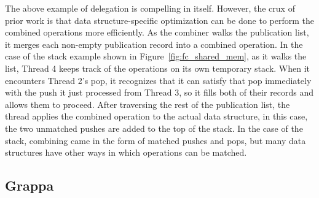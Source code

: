 The above example of delegation is compelling in itself. However, the crux of prior work is that data structure-specific optimization can be done to perform the combined operations more efficiently.
As the combiner walks the publication list, it merges each non-empty publication record into a combined operation. In the case of the stack example shown in Figure~\ref{fig:fc_shared_mem}, as it walks the list, Thread 4 keeps track of the operations on its own temporary stack. When it encounters Thread 2's pop, it recognizes that it can satisfy that pop immediately with the push it just processed from Thread 3, so it fills both of their records and allows them to proceed. After traversing the rest of the publication list, the thread applies the combined operation to the actual data structure, in this case, the two unmatched pushes are added to the top of the stack.
In the case of the stack, combining came in the form of matched pushes and pops, but many data structures have other ways in which operations can be matched.

\subsection{Grappa}

